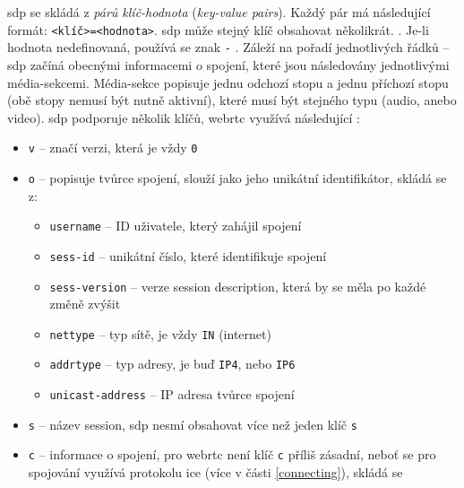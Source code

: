 \gls{sdp} se skládá z \textit{párů klíč-hodnota} (\textit{key-value pairs}).
Každý pár má následující formát: \texttt{<klíč>=<hodnota>}. \gls{sdp}
může stejný klíč obsahovat několikrát. \parencite{WebRTCForTheCurious}. Je-li
hodnota nedefinovaná, používá se znak \texttt{-}
\parencite{IETF-RFC8866}. Záleží na pořadí jednotlivých řádků -- \gls{sdp}
začíná obecnými informacemi o spojení, které jsou následovány jednotlivými
média-sekcemi. Média-sekce popisuje jednu odchozí stopu a jednu příchozí stopu
(obě stopy nemusí být nutně aktivní), které musí být stejného typu (audio, anebo
video). \gls{sdp} podporuje několik klíčů, \gls{webrtc} využívá následující
\parencite{WebRTCForTheCurious,IETF-RFC8866}:

\begin{itemize}
    \item \texttt{v} -- značí verzi, která je vždy
          \texttt{0}
    \item \texttt{o} -- popisuje tvůrce spojení, slouží jako jeho
          unikátní identifikátor, skládá se z:
          \begin{itemize}
              \item \texttt{username} -- ID uživatele, který zahájil
                    spojení
              \item \texttt{sess-id} -- unikátní číslo, které
                    identifikuje spojení
              \item \texttt{sess-version} -- verze session
                    description, která by se měla po každé změně zvýšit
              \item \texttt{nettype} -- typ sítě, je vždy
                    \texttt{IN} (internet)
              \item \texttt{addrtype} -- typ adresy, je buď
                    \texttt{IP4}, nebo \texttt{IP6}
              \item \texttt{unicast-address} -- IP adresa tvůrce
                    spojení
          \end{itemize}
    \item \texttt{s} -- název session, \gls{sdp} nesmí obsahovat více
          než jeden klíč \texttt{s}
    \item \texttt{c} -- informace o spojení, pro \gls{webrtc} není
          klíč \texttt{c} příliš zásadní, neboť se pro spojování
          využívá protokolu \gls{ice} (více v části \ref{connecting}), skládá se

\end{itemize}
